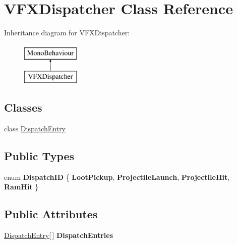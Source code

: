 \hypertarget{class_v_f_x_dispatcher}{\section{V\-F\-X\-Dispatcher Class Reference}
\label{class_v_f_x_dispatcher}
}
Inheritance diagram for V\-F\-X\-Dispatcher\-:\begin{figure}[H]
\begin{center}
\leavevmode
\includegraphics[height=2.000000cm]{class_v_f_x_dispatcher}
\end{center}
\end{figure}
\subsection*{Classes}
\begin{DoxyCompactItemize}
\item 
class \hyperlink{class_v_f_x_dispatcher_1_1_dispatch_entry}{Dispatch\-Entry}
\end{DoxyCompactItemize}
\subsection*{Public Types}
\begin{DoxyCompactItemize}
\item 
enum {\bfseries Dispatch\-I\-D} \{ {\bfseries Loot\-Pickup}, 
{\bfseries Projectile\-Launch}, 
{\bfseries Projectile\-Hit}, 
{\bfseries Ram\-Hit}
 \}
\end{DoxyCompactItemize}
\subsection*{Public Attributes}
\begin{DoxyCompactItemize}
\item 
\hypertarget{class_v_f_x_dispatcher_aa285051e79eb6d52bb01fedbd8a9c29e}{\hyperlink{class_v_f_x_dispatcher_1_1_dispatch_entry}{Dispatch\-Entry}\mbox{[}$\,$\mbox{]} {\bfseries Dispatch\-Entries}}\label{class_v_f_x_dispatcher_aa285051e79eb6d52bb01fedbd8a9c29e}

\end{DoxyCompactItemize}
